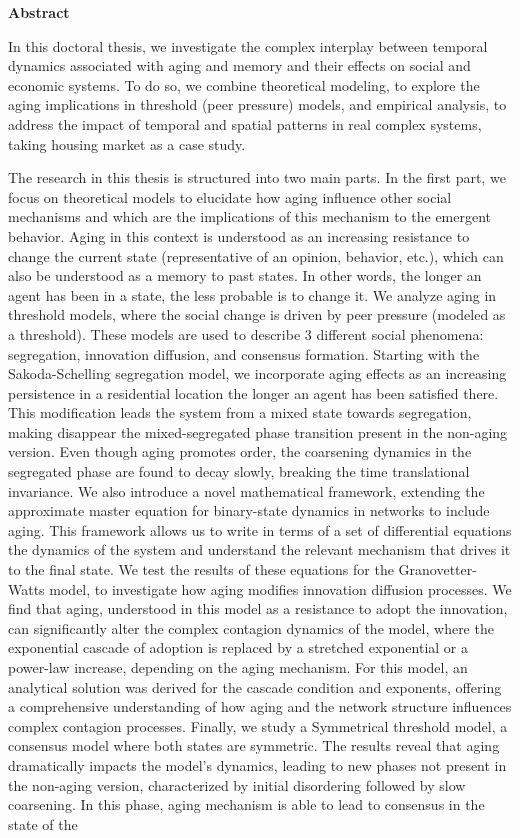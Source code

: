 \pagebreak
\thispagestyle{empty}
\textbf{ \huge Abstract}

\vspace*{0.5cm}

In this doctoral thesis, we investigate the complex interplay between temporal dynamics associated with aging and memory and their effects on social and economic systems. To do so, we combine theoretical modeling, to explore the aging implications in threshold (peer pressure) models, and empirical analysis, to address the impact of temporal and spatial patterns in real complex systems, taking housing market as a case study.

The research in this thesis is structured into two main parts. In the first part, we focus on theoretical models to elucidate how aging influence other social mechanisms and which are the implications of this mechanism to the emergent behavior. Aging in this context is understood as an increasing resistance to change the current state (representative of an opinion, behavior, etc.), which can also be understood as a memory to past states. In other words, the longer an agent has been in a state, the less probable is to change it. We analyze aging in threshold models, where the social change is driven by peer pressure (modeled as a threshold). These models are used to describe 3 different social phenomena: segregation, innovation diffusion, and consensus formation. Starting with the Sakoda-Schelling segregation model, we incorporate aging effects as an increasing persistence in a residential location the longer an agent has been satisfied there. This modification leads the system from a mixed state towards segregation, making disappear the mixed-segregated phase transition present in the non-aging version. Even though aging promotes order, the coarsening dynamics in the segregated phase are found to decay slowly, breaking the time translational invariance. We also introduce a novel mathematical framework, extending the approximate master equation for binary-state dynamics in networks to include aging. This framework allows us to write in terms of a set of differential equations the dynamics of the system and understand the relevant mechanism that drives it to the final state. We test the results of these equations for the Granovetter-Watts model, to investigate how aging modifies innovation diffusion processes. We find that aging, understood in this model as a resistance to adopt the innovation, can significantly alter the complex contagion dynamics of the model, where the exponential cascade of adoption is replaced by a stretched exponential or a power-law increase, depending on the aging mechanism. For this model, an analytical solution was derived for the cascade condition and exponents, offering a comprehensive understanding of how aging and the network structure influences complex contagion processes. Finally, we study a Symmetrical threshold model, a consensus model where both states are symmetric. The results reveal that aging dramatically impacts the model's dynamics, leading to new phases not present in the non-aging version, characterized by initial disordering followed by slow coarsening. In this phase, aging mechanism is able to lead to consensus in the state of the 